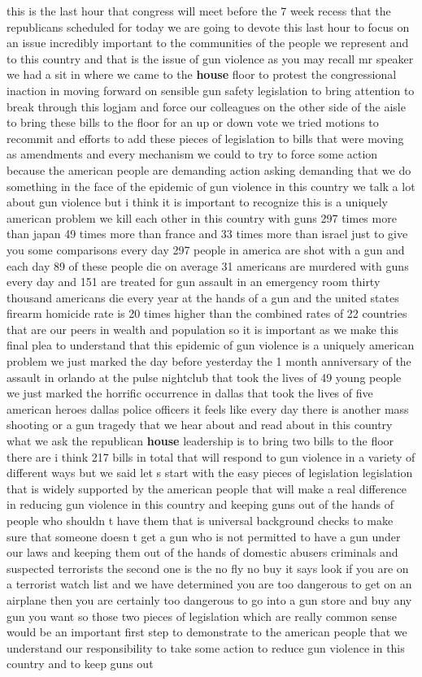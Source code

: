 \documentclass{article}
\begin{document}
this is the last hour that congress will meet before the 7 week recess that the republicans scheduled for today we are going to devote this last hour to focus on an issue incredibly important to the communities of the people we represent and to this country and that is the issue of gun violence as you may recall mr speaker we had a sit in where we came to the {\bf \color{red} house} floor to protest the congressional inaction in moving forward on sensible gun safety legislation to bring attention to break through this logjam and force our colleagues on the other side of the aisle to bring these bills to the floor for an up or down vote we tried motions to recommit and efforts to add these pieces of legislation to bills that were moving as amendments and every mechanism we could to try to force some action because the american people are demanding action asking demanding that we do something in the face of the epidemic of gun violence in this country we talk a lot about gun violence but i think it is important to recognize this is a uniquely american problem we kill each other in this country with guns 297 times more than japan 49 times more than france and 33 times more than israel just to give you some comparisons every day 297 people in america are shot with a gun and each day 89 of these people die on average 31 americans are murdered with guns every day and 151 are treated for gun assault in an emergency room thirty thousand americans die every year at the hands of a gun and the united states firearm homicide rate is 20 times higher than the combined rates of 22 countries that are our peers in wealth and population so it is important as we make this final plea to understand that this epidemic of gun violence is a uniquely american problem we just marked the day before yesterday the 1 month anniversary of the assault in orlando at the pulse nightclub that took the lives of 49 young people we just marked the horrific occurrence in dallas that took the lives of five american heroes dallas police officers it feels like every day there is another mass shooting or a gun tragedy that we hear about and read about in this country what we ask the republican {\bf \color{red} house} leadership is to bring two bills to the floor there are i think 217 bills in total that will respond to gun violence in a variety of different ways but we said let s start with the easy pieces of legislation legislation that is widely supported by the american people that will make a real difference in reducing gun violence in this country and keeping guns out of the hands of people who shouldn t have them that is universal background checks to make sure that someone doesn t get a gun who is not permitted to have a gun under our laws and keeping them out of the hands of domestic abusers criminals and suspected terrorists the second one is the no fly no buy it says look if you are on a terrorist watch list and we have determined you are too dangerous to get on an airplane then you are certainly too dangerous to go into a gun store and buy any gun you want so those two pieces of legislation which are really common sense would be an important first step to demonstrate to the american people that we understand our responsibility to take some action to reduce gun violence in this country and to keep guns out 
\end{document}

